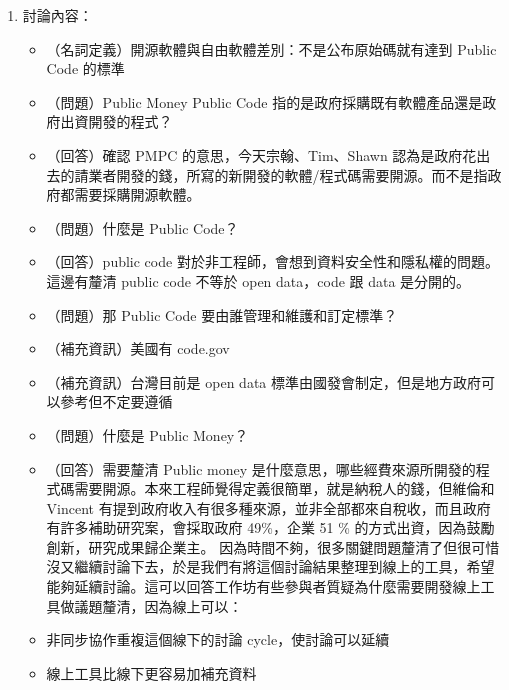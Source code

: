 \documentclass[12pt,a4paper]{article}
\begin{document}
\begin{enumerate}
\begin{enumerate}
\begin{enumerate}
\begin{center}
\end{center}
\item 討論內容：
\begin{itemize}
\item （名詞定義）開源軟體與自由軟體差別：不是公布原始碼就有達到 Public Code 的標準
\item （問題）Public Money Public Code 指的是政府採購既有軟體產品還是政府出資開發的程式？
\item （回答）確認 PMPC 的意思，今天宗翰、Tim、Shawn 認為是政府花出去的請業者開發的錢，所寫的新開發的軟體/程式碼需要開源。而不是指政府都需要採購開源軟體。
\item （問題）什麼是 Public Code？
\item （回答）public code 對於非工程師，會想到資料安全性和隱私權的問題。這邊有釐清 public code 不等於 open data，code 跟 data 是分開的。
\item （問題）那 Public Code 要由誰管理和維護和訂定標準？
\item （補充資訊）美國有 code.gov
\item （補充資訊）台灣目前是 open data 標準由國發會制定，但是地方政府可以參考但不定要遵循
\item （問題）什麼是 Public Money？
\item （回答）需要釐清 Public money 是什麼意思，哪些經費來源所開發的程式碼需要開源。本來工程師覺得定義很簡單，就是納稅人的錢，但維倫和 Vincent 有提到政府收入有很多種來源，並非全部都來自稅收，而且政府有許多補助研究案，會採取政府 49\%，企業 51 \% 的方式出資，因為鼓勵創新，研究成果歸企業主。
因為時間不夠，很多關鍵問題釐清了但很可惜沒又繼續討論下去，於是我們有將這個討論結果整理到線上的工具，希望能夠延續討論。這可以回答工作坊有些參與者質疑為什麼需要開發線上工具做議題釐清，因為線上可以：
\item 非同步協作重複這個線下的討論 cycle，使討論可以延續
\item 線上工具比線下更容易加補充資料
\end{itemize}
\end{enumerate}


\end{enumerate}
\end{enumerate}
\end{document}
